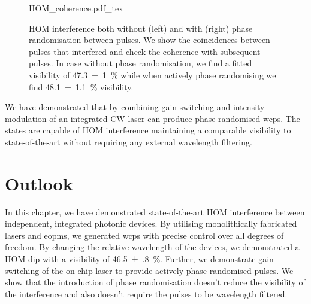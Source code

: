 \begin{figure}[tp]
	\centering
	\tiny
	\def\svgwidth{\textwidth} 
	{HOM_coherence.pdf_tex}
	\caption[Hong-Ou-Mandel interference with and without phase randomisation]{\ac{HOM} interference both without (left) and with (right) phase randomisation between pulses. We show the coincidences between pulses that interfered and check the coherence with subsequent pulses. In case without phase randomisation, we find a fitted visibility of \SI{47.3(10)}{\percent} while when actively phase randomising we find \SI{48.1(11)}{\percent} visibility.}
	\label{fig:HOM_coherence}
\end{figure}

We have demonstrated that by combining gain-switching and intensity modulation of an integrated \ac{CW} laser can produce phase randomised \acp{wcp}. The states are capable of \ac{HOM} interference maintaining a comparable visibility to state-of-the-art without requiring any external wavelength filtering.

\section{Outlook}

In this chapter, we have demonstrated state-of-the-art \acl{HOM} interference between independent, integrated photonic devices. By utilising monolithically fabricated lasers and \acp{eopm}, we generated \acp{wcp} with precise control over all degrees of freedom. By changing the relative wavelength of the devices, we demonstrated a \ac{HOM} dip with a visibility of \SI{46.5(8)}{\%}. Further, we demonstrate gain-switching of the on-chip laser to provide actively phase randomised pulses. We show that the introduction of phase randomisation doesn't reduce the visibility of the interference and also doesn't require the pulses to be wavelength filtered.



